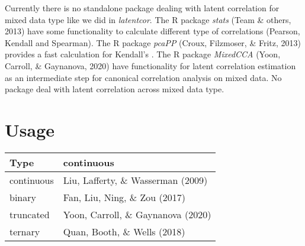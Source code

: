 \documentclass[10pt,a4paper,onecolumn]{article}
\begin{document}
Currently there is no standalone package dealing with latent correlation
for mixed data type like we did in \emph{latentcor}. The R package
\emph{stats} (Team \& others, 2013) have some functionality to calculate
different type of correlations (Pearson, Kendall and Spearman). The R
package \emph{pcaPP} (Croux, Filzmoser, \& Fritz, 2013) provides a fast
calculation for Kendall's \tau. The R package \emph{MixedCCA} (Yoon,
Carroll, \& Gaynanova, 2020) have functionality for latent correlation
estimation as an intermediate step for canonical correlation analysis on
mixed data. No package deal with latent correlation across mixed data
type.

\hypertarget{usage}{%
\section{Usage}\label{usage}}

\begin{longtable}[]{@{}ll@{}}
\toprule
Type & continuous \\
\midrule
\endhead
continuous & Liu, Lafferty, \& Wasserman (2009) \\
binary & Fan, Liu, Ning, \& Zou (2017) \\
truncated & Yoon, Carroll, \& Gaynanova (2020) \\
ternary & Quan, Booth, \& Wells (2018) \\
\bottomrule
\end{longtable}
\end{document}
